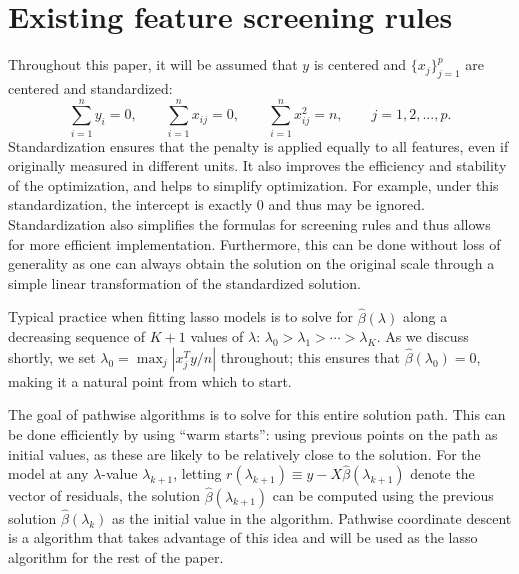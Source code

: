 \section{Existing feature screening rules}
\label{sec:existing}

Throughout this paper, it will be assumed that $y$ is centered and $\{x_j\}_{j=1}^p$ are centered and standardized:
\begin{equation}
  \label{eq:std}
  \sum_{i=1}^ny_i=0, \qquad \sum_{i=1}^n x_{ij}=0, \qquad \sum_{i=1}^n x_{ij}^2=n,\qquad j=1,2,...,p.
\end{equation}
Standardization ensures that the penalty is applied equally to all features, even if originally measured in different units. It also improves the efficiency and stability of the optimization, and helps to simplify optimization.  For example, under this standardization, the intercept is exactly 0 and thus may be ignored.  Standardization also simplifies the formulas for screening rules and thus allows for more efficient implementation.  Furthermore, this can be done without loss of generality as one can always obtain the solution on the original scale through a simple linear transformation of the standardized solution.

Typical practice when fitting lasso models is to solve for $\hat{\beta}(\lambda)$ along a decreasing sequence of $K+1$ values of $\lambda$: $\lambda_0 > \lambda_1 > \cdots > \lambda_K$.  As we discuss shortly, we set $\lambda_0=\max_j|x_j^Ty/n|$ throughout; this ensures that $\hat{\beta}(\lambda_0)=0$, making it a natural point from which to start.

The goal of pathwise algorithms is to solve for this entire solution path.  This can be done efficiently by using ``warm starts'': using previous points on the path as initial values, as these are likely to be relatively close to the solution.  For the model at any $\lambda$-value $\lambda_{k+1}$, letting $r(\lambda_{k+1}) \equiv y-X\hat{\beta}(\lambda_{k+1})$ denote the vector of residuals, the solution $\hat{\beta}(\lambda_{k+1})$ can be computed using the previous solution $\hat{\beta}(\lambda_k)$ as the initial value in the algorithm. Pathwise coordinate descent is a algorithm that takes advantage of this idea and will be used as the lasso algorithm for the rest of the paper.

